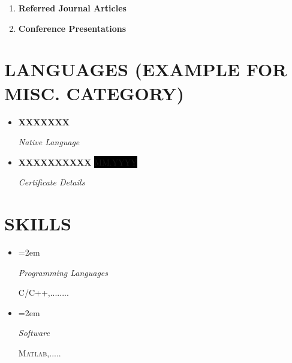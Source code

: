 \documentclass[paper=a4,fontsize=11pt]{scrartcl} %
\newlength{\spacebox}
\newcommand{\sepspace}{\vspace*{1em}}		%
\newcommand{\NewPart}[1]{\section*{\uppercase{#1}}}
\newcommand{\PersonalEntry}[2]{
		\noindent\hangindent=2em\hangafter=0 %
		\parbox{\spacebox}{        %
		\textit{#1}}		       %
		\hspace{1.5em} #2 \par}    %
\newcommand{\SkillsEntry}[2]{      %
		\noindent\hangindent=2em\hangafter=0 %
		\parbox{\spacebox}{        %
		\textit{#1}}			   %
		\hspace{1.5em} #2 \par}    %
\newcommand{\MiscEntry}[2]{
		\noindent \textbf{#1} \par      %
		\noindent \textit{#2} \par              %
		\normalsize \par}
\newcommand{\MiscEntryDate}[3]{
		\noindent \textbf{#1} \hfill      %
		\colorbox{Black}{\color{White}#2} \par  %
		\noindent \textit{#3} \par              %
		\normalsize \par}
\begin{document}
\begin{enumerate}[label=\textbf{\Alph*.},leftmargin=*]
    \item   \textbf{Referred Journal Articles}
            \begin{refsection}
            \nocite{*}
            \printbibliography[heading=none]
            \end{refsection}
    \item   \textbf{Conference Presentations}
            \begin{refsection}
            \nocite{*}
            \printbibliography[heading=none]
            \end{refsection}
\end{enumerate}





\NewPart{Languages (Example for Misc. Category)}

\begin{itemize}[leftmargin=*]
    \item \MiscEntry{XXXXXXX}{Native Language}
    \item \MiscEntryDate{XXXXXXXXXX}{\footnotesize MM.YYYY}{Certificate Details}
\end{itemize}
\sepspace





\NewPart{Skills}

\begin{itemize}
    \item[] \SkillsEntry{Programming Languages}{\textsc{C/C++},........}
    \item[] \SkillsEntry{Software}{\textsc{Matlab},.....}
\end{itemize}
\sepspace
\end{document}
